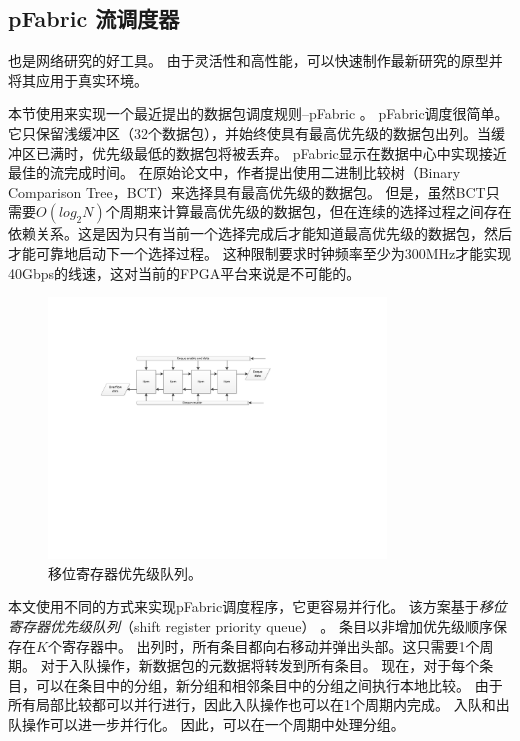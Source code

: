 \subsection{pFabric 流调度器}


\name 也是网络研究的好工具。
由于灵活性和高性能，\name 可以快速制作最新研究的原型并将其应用于真实环境。

本节使用\name 来实现一个最近提出的数据包调度规则--pFabric \cite {pfabric}。
pFabric调度很简单。它只保留浅缓冲区（32个数据包），并始终使具有最高优先级的数据包出列。当缓冲区已满时，优先级最低的数据包将被丢弃。
pFabric显示在数据中心中实现接近最佳的流完成时间。
在原始论文中，作者提出使用二进制比较树（Binary Comparison Tree，BCT）来选择具有最高优先级的数据包。
但是，虽然BCT只需要$O(log_2 N)$个周期来计算最高优先级的数据包，但在连续的选择过程之间存在依赖关系。这是因为只有当前一个选择完成后才能知道最高优先级的数据包，然后才能可靠地启动下一个选择过程。
这种限制要求时钟频率至少为300MHz才能实现40Gbps的线速，这对当前的FPGA平台来说是不可能的。




\begin{figure}[htbp]
	\centering
	\includegraphics[width=0.8\textwidth]{image/ShiftRegPrioQueue}
	\caption{移位寄存器优先级队列。}
	\label{clicknp:fig:ShiftRegPrioQueue}
\end{figure}

本文使用不同的方式来实现pFabric调度程序，它更容易并行化。
该方案基于\textit{移位寄存器优先级队列}（shift register priority queue） \cite {moon2000scalable}。
条目以非增加优先级顺序保存在$K$个寄存器中。
出列时，所有条目都向右移动并弹出头部。这只需要1个周期。
对于入队操作，新数据包的元数据将转发到所有条目。
现在，对于每个条目，可以在条目中的分组，新分组和相邻条目中的分组之间执行本地比较。
由于所有局部比较都可以并行进行，因此入队操作也可以在1个周期内完成。
入队和出队操作可以进一步并行化。
因此，可以在一个周期中处理分组。



